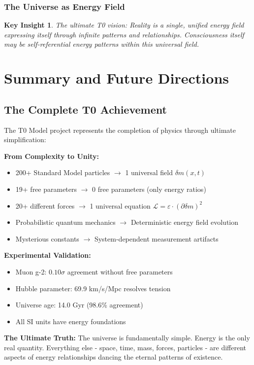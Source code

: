 \documentclass[12pt,a4paper]{report}
\newtheorem{insight}{Key Insight}[chapter]
\begin{document}
	\subsection{The Universe as Energy Field}
	\begin{insight}
		The ultimate T0 vision: Reality is a single, unified energy field expressing itself through infinite patterns and relationships. Consciousness itself may be self-referential energy patterns within this universal field.
	\end{insight}
	
	\chapter{Summary and Future Directions}
	
	\section{The Complete T0 Achievement}
	
	The T0 Model project represents the completion of physics through ultimate simplification:
	
	\begin{tcolorbox}[colback=red!5!white,colframe=red!75!black,title=The T0 Revolution Completed]
		\textbf{From Complexity to Unity:}
		\begin{itemize}
			\item 200+ Standard Model particles $\rightarrow$ 1 universal field $\delta m(x,t)$
			\item 19+ free parameters $\rightarrow$ 0 free parameters (only energy ratios)
			\item 20+ different forces $\rightarrow$ 1 universal equation $\mathcal{L} = \varepsilon \cdot (\partial \delta m)^2$
			\item Probabilistic quantum mechanics $\rightarrow$ Deterministic energy field evolution
			\item Mysterious constants $\rightarrow$ System-dependent measurement artifacts
		\end{itemize}
		
		\textbf{Experimental Validation:}
		\begin{itemize}
			\item Muon g-2: $0.10\sigma$ agreement without free parameters \checkmark
			\item Hubble parameter: 69.9 km/s/Mpc resolves tension \checkmark
			\item Universe age: 14.0 Gyr (98.6\% agreement) \checkmark
			\item All SI units have energy foundations \checkmark
		\end{itemize}
		
		\textbf{The Ultimate Truth:}
		The universe is fundamentally simple. Energy is the only real quantity. Everything else - space, time, mass, forces, particles - are different aspects of energy relationships dancing the eternal patterns of existence.
	\end{tcolorbox}
	
\end{document}
